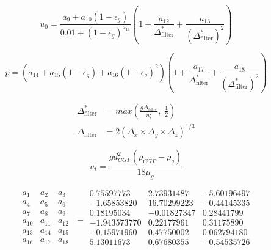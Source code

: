 \documentclass{article}
\begin{document}
\begin{equation}
    u_0 = \frac{a_9 + a_{10} (1 - \epsilon_g)}{0.01 + (1 - \epsilon_g)^{a_{11}}} \left(1 + \frac{a_{12}}{\Delta_{\text{filter}}^*} + \frac{a_{13}}{(\Delta_{\text{filter}}^*)^2} \right)
\end{equation}

\begin{equation}
    p = \left(a_{14} + a_{15}(1 - \epsilon_g) + a_{16}(1 - \epsilon_g)^2 \right) \left(1 + \frac{a_{17}}{\Delta_{\text{filter}}^*} + \frac{a_{18}}{(\Delta_{\text{filter}}^*)^2} \right)
\end{equation}

\begin{align}
    \Delta_{\text{filter}}^* &= max\left( \frac{g \Delta_{\text{filter}}}{u_t^2}, \; \frac{1}{2} \right) \\
    \Delta_{\text{filter}} &= 2 (\Delta_x \times \Delta_y \times \Delta_z)^{1/3}
\end{align}

\begin{equation}
    u_t = \frac{g d_{CGP}^2 (\rho_{CGP} - \rho_g)}{18 \mu_g}
\end{equation}

\begin{equation}
    \begin{matrix}
        a_1    & a_2    & a_3 \\
        a_4    & a_5    & a_6 \\
        a_7    & a_8    & a_9 \\
        a_{10} & a_{11} & a_{12} \\
        a_{13} & a_{14} & a_{15} \\
        a_{16} & a_{17} & a_{18} \\
    \end{matrix}
    \; =
    \begin{array}{rrr}
        0.75597773   & 2.73931487  & -5.60196497 \\
        -1.65853820  & 16.70299223 & -0.44145335 \\
        0.18195034   & -0.01827347 & 0.28441799  \\
        -1.943573770 & 0.22177961  & 0.31175890  \\
        -0.15971960  & 0.47750002  & 0.062794180 \\
        5.13011673   & 0.67680355  & -0.54535726 \\
    \end{array}
\end{equation}
\end{document}
